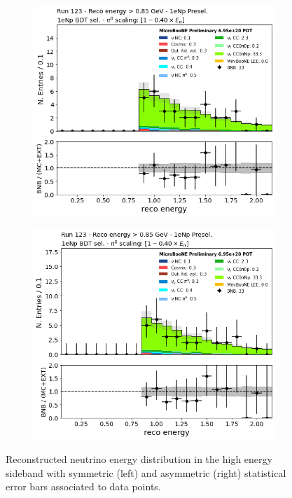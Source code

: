 \begin{figure}[H] 
\begin{center}
    \begin{subfigure}[b]{0.4\textwidth}
    \centering
    \includegraphics[width=1.00\textwidth]{Appendix/Figures/symm-sqrtN.png}
    \end{subfigure}
    \begin{subfigure}[b]{0.4\textwidth}
    \centering
    \includegraphics[width=1.00\textwidth]{Appendix/Figures/asymm-classical.png}
    \end{subfigure}
\caption{\label{fig:dataerrs} Reconstructed neutrino energy distribution in the \npsel high energy sideband with symmetric (left) and asymmetric (right) statistical error bars associated to data points.}
\end{center}
\end{figure}
